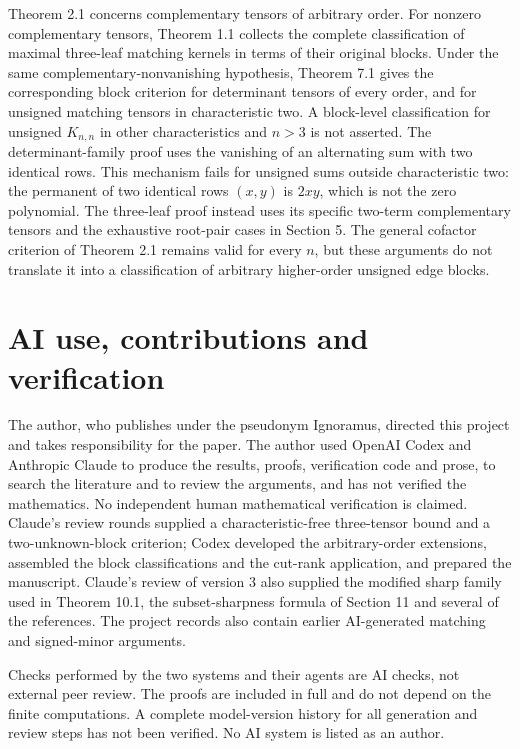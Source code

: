 \documentclass[11pt]{article}
\begin{document}
Theorem 2.1 concerns complementary tensors of arbitrary order. For nonzero complementary tensors, Theorem 1.1 collects the complete classification of maximal three-leaf matching kernels in terms of their original blocks. Under the same complementary-nonvanishing hypothesis, Theorem 7.1 gives the corresponding block criterion for determinant tensors of every order, and for unsigned matching tensors in characteristic two. A block-level classification for unsigned $K_{n,n}$ in other characteristics and $n>3$ is not asserted. The determinant-family proof uses the vanishing of an alternating sum with two identical rows. This mechanism fails for unsigned sums outside characteristic two: the permanent of two identical rows $(x,y)$ is $2xy$, which is not the zero polynomial. The three-leaf proof instead uses its specific two-term complementary tensors and the exhaustive root-pair cases in Section 5. The general cofactor criterion of Theorem 2.1 remains valid for every $n$, but these arguments do not translate it into a classification of arbitrary higher-order unsigned edge blocks.


\section*{AI use, contributions and verification}

The author, who publishes under the pseudonym Ignoramus, directed this project and takes responsibility for the paper. The author used OpenAI Codex and Anthropic Claude to produce the results, proofs, verification code and prose, to search the literature and to review the arguments, and has not verified the mathematics. No independent human mathematical verification is claimed. Claude's review rounds supplied a characteristic-free three-tensor bound and a two-unknown-block criterion; Codex developed the arbitrary-order extensions, assembled the block classifications and the cut-rank application, and prepared the manuscript. Claude's review of version 3 also supplied the modified sharp family used in Theorem 10.1, the subset-sharpness formula of Section 11 and several of the references. The project records also contain earlier AI-generated matching and signed-minor arguments.


Checks performed by the two systems and their agents are AI checks, not external peer review. The proofs are included in full and do not depend on the finite computations. A complete model-version history for all generation and review steps has not been verified. No AI system is listed as an author.
\end{document}
